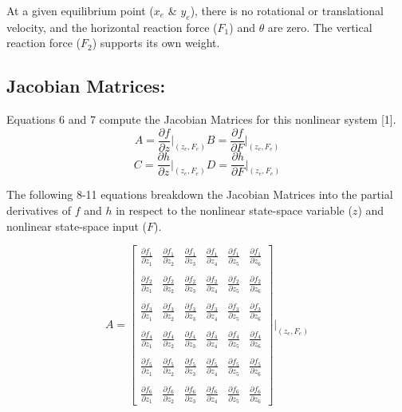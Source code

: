 \documentclass[conference]{IEEEtran}
\begin{document}
At a given equilibrium point ($x_e$ \& $y_e$), there is no rotational or translational velocity, and the horizontal reaction force ($F_1$) and $\theta$ are zero. The vertical reaction force ($F_2$) supports its own weight. 

\subsection{Jacobian Matrices:}
Equations 6 and 7 compute the Jacobian Matrices for this nonlinear system [1].
\[ 
A = \frac{\partial f}{\partial z}\bigg|_{(z_e,F_e)}
B = \frac{\partial f}{\partial F}\bigg|_{(z_e,F_e)}
\tag{6}
\]
\[ 
C = \frac{\partial h}{\partial z}\bigg|_{(z_e,F_e)}
D = \frac{\partial h}{\partial F}\bigg|_{(z_e,F_e)}
\tag{7}
\]

\newpage
The following 8-11 equations breakdown the Jacobian Matrices into the partial derivatives of $f$ and $h$ in respect to the nonlinear state-space variable ($z$) and nonlinear state-space input ($F$).

\[
A = 
\begin{bmatrix}
\frac{\partial f_1}{\partial z_1}&\frac{\partial f_1}{\partial z_2}& \frac{\partial f_1}{\partial z_3}& \frac{\partial f_1}{\partial z_4}& \frac{\partial f_1}{\partial z_5} &\frac{\partial f_1}{\partial z_6}\\\\
\frac{\partial f_2}{\partial z_1}&\frac{\partial f_2}{\partial z_2}& \frac{\partial f_2}{\partial z_3}& \frac{\partial f_2}{\partial z_4}& \frac{\partial f_2}{\partial z_5} &\frac{\partial f_2}{\partial z_6}\\\\
\frac{\partial f_3}{\partial z_1}&\frac{\partial f_3}{\partial z_2}& \frac{\partial f_3}{\partial z_3}& \frac{\partial f_3}{\partial z_4}& \frac{\partial f_3}{\partial z_5} &\frac{\partial f_3}{\partial z_6}\\\\
\frac{\partial f_4}{\partial z_1}&\frac{\partial f_4}{\partial z_2}& \frac{\partial f_4}{\partial z_3}& \frac{\partial f_4}{\partial z_4}& \frac{\partial f_4}{\partial z_5} &\frac{\partial f_4}{\partial z_6}\\\\
\frac{\partial f_5}{\partial z_1}&\frac{\partial f_5}{\partial z_2}& \frac{\partial f_5}{\partial z_3}& \frac{\partial f_5}{\partial z_4}& \frac{\partial f_5}{\partial z_5} &\frac{\partial f_5}{\partial z_6}\\\\
\frac{\partial f_6}{\partial z_1}&\frac{\partial f_6}{\partial z_2}& \frac{\partial f_6}{\partial z_3}& \frac{\partial f_6}{\partial z_4}& \frac{\partial f_6}{\partial z_5} &\frac{\partial f_6}{\partial z_6}
\end{bmatrix}
\Bigg|_{(z_e,F_e)} 
\tag{8}
\] 
\end{document}

